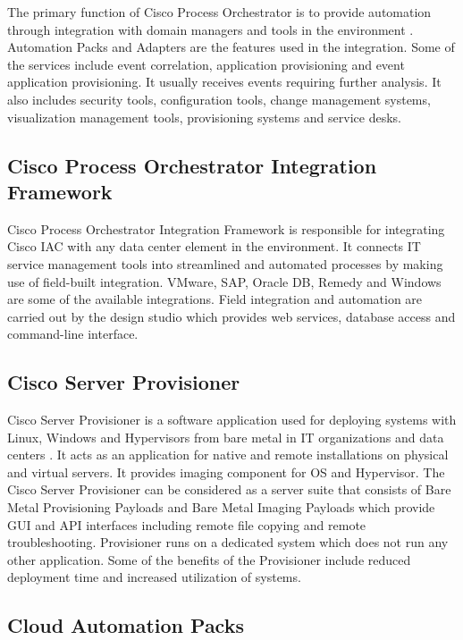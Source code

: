 \documentclass[9pt,twocolumn,twoside]{../../styles/osajnl}
\begin{document}
The primary function of Cisco Process Orchestrator is to provide
automation through integration with domain managers and tools in the
environment \cite{orchestrator-datasheet}. Automation Packs and
Adapters are the features used in the integration. Some of the
services include event correlation, application provisioning and event
application provisioning. It usually receives events requiring further
analysis. It also includes security tools, configuration tools, change
management systems, visualization management tools, provisioning
systems and service desks.

\subsection{Cisco Process Orchestrator Integration Framework}

Cisco Process Orchestrator Integration Framework is responsible for
integrating Cisco IAC with any data center element in the
environment. It connects IT service management tools into streamlined
and automated processes by making use of field-built
integration. VMware, SAP, Oracle DB, Remedy and Windows are some of
the available integrations. Field integration and automation are
carried out by the design studio which provides web services, database
access and command-line interface.

\subsection{Cisco Server Provisioner}

Cisco Server Provisioner is a software application used for deploying
systems with Linux, Windows and Hypervisors from bare metal in IT
organizations and data centers \cite{cisco-provisioner}. It acts as an
application for native and remote installations on physical and
virtual servers. It provides imaging component for OS and
Hypervisor. The Cisco Server Provisioner can be considered as a server
suite that consists of Bare Metal Provisioning Payloads and Bare Metal
Imaging Payloads which provide GUI and API interfaces including remote
file copying and remote troubleshooting. Provisioner runs on a
dedicated system which does not run any other application. Some of the
benefits of the Provisioner include reduced deployment time and
increased utilization of systems.

\subsection{Cloud Automation Packs}
\end{document}
